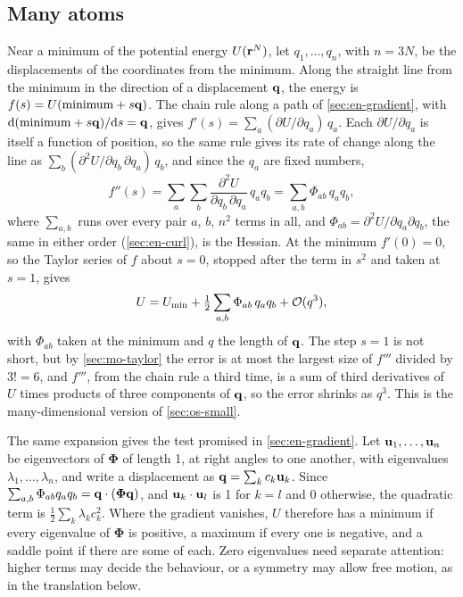 \subsection*{Many atoms}

Near a minimum of the potential energy $U(\bm{\mathrm{r}}^N)$, let $q_1, \dots,
q_n$, with $n = 3N$, be the displacements of the coordinates from the
minimum. Along the straight line from the minimum in the direction of a
displacement $\bm{\mathrm{q}}$, the energy is $f(s) = U(\text{minimum} + s\bm{\mathrm{q}})$.
The chain rule along a path of \cref{sec:en-gradient}, with $\mathrm{d}(\text{minimum} +
s\bm{\mathrm{q}})/\mathrm{d} s = \bm{\mathrm{q}}$, gives $f'(s) = \sum_a(\partial U/\partial
q_a)\,q_a$. Each $\partial U/\partial q_a$ is itself a function of
position, so the same rule gives its rate of change along the line as
$\sum_b(\partial^2U/\partial q_b\,\partial q_a)\,q_b$, and since the $q_a$
are fixed numbers,
\begin{equation*}
   f''(s) = \sum_a\sum_b\frac{\partial^2U}{\partial q_b\,\partial q_a}\,
   q_aq_b = \sum_{a,b}\Phi_{ab}\,q_aq_b ,
\end{equation*}
where $\sum_{a,b}$ runs over every pair $a$, $b$, $n^2$ terms in all, and
$\Phi_{ab} = \partial^2U/\partial q_a\partial q_b$, the same in either
order (\cref{sec:en-curl}), is the Hessian. At the minimum $f'(0) = 0$, so
the Taylor series of $f$ about $s = 0$, stopped after the term in $s^2$
and taken at $s = 1$, gives
\begin{equation*}
   U = U_{\min} + \tfrac12\sum_{a,b} \Phi_{ab}\,q_a q_b + \mathcal{O}(q^3) ,
\end{equation*}
with $\Phi_{ab}$ taken at the minimum and $q$ the length of $\bm{\mathrm{q}}$. The
step $s = 1$ is not short, but by \cref{sec:mo-taylor} the error is at
most the largest size of $f'''$ divided by $3! = 6$, and $f'''$, from the
chain rule a third time, is a sum of third derivatives of $U$ times
products of three components of $\bm{\mathrm{q}}$, so the error shrinks as $q^3$.
This is the many-dimensional version of \cref{sec:os-small}.

The same expansion gives the test promised in \cref{sec:en-gradient}. Let
$\bm{\mathrm{u}}_1, \dots, \bm{\mathrm{u}}_n$ be eigenvectors of $\boldsymbol{\Phi}$ of
length 1, at right angles to one another, with eigenvalues $\lambda_1,
\dots, \lambda_n$, and write a displacement as $\bm{\mathrm{q}} = \sum_k
c_k\bm{\mathrm{u}}_k$. Since $\sum_{a,b}\Phi_{ab}q_aq_b = \bm{\mathrm{q}}\cdot
(\boldsymbol{\Phi}\bm{\mathrm{q}})$, and $\bm{\mathrm{u}}_k\cdot\bm{\mathrm{u}}_l$ is 1 for $k = l$
and 0 otherwise, the quadratic term is $\frac12\sum_k\lambda_k c_k^2$.
Where the gradient vanishes, $U$ therefore has a minimum if every
eigenvalue of $\boldsymbol{\Phi}$ is positive, a maximum if every one is
negative, and a saddle point if there are some of each. Zero eigenvalues
need separate attention: higher terms may decide the behaviour, or a
symmetry may allow free motion, as in the translation below.

